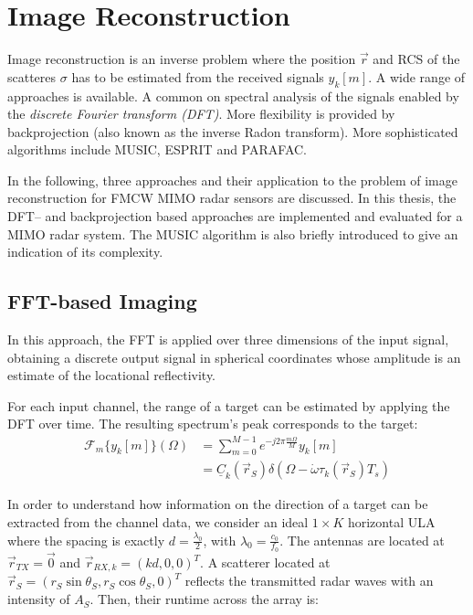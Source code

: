 \section{Image Reconstruction}
Image reconstruction is an inverse problem where the position $\vec r$ and RCS of the scatteres $\sigma$
has to be estimated from the received signals $y_k[m]$.
A wide range of approaches is available.
A common on spectral analysis of the signals enabled by the \emph{discrete Fourier transform (DFT)}.
More flexibility is provided by backprojection (also known as the inverse Radon transform).
More sophisticated algorithms include MUSIC, ESPRIT and PARAFAC.

In the following, three approaches and their application to
the problem of image reconstruction for FMCW MIMO radar sensors are discussed.
In this thesis, the DFT-- and backprojection based approaches
are implemented and evaluated for a MIMO radar system.
The MUSIC algorithm is also briefly introduced to give an indication of its complexity.

\subsection{FFT-based Imaging}
\label{sec:dft_imaging_theory}
In this approach, the FFT is applied over three dimensions of the input signal,
obtaining a discrete output signal in spherical coordinates whose amplitude is an estimate of the locational reflectivity.

For each input channel, the range of a target can be estimated by applying the DFT over time.
The resulting spectrum's peak corresponds to the target:
\begin{align}
    \mathcal{F}_m\{y_k[m]\}(\Omega) & = \sum_{m=0}^{M-1} e^{-j2\pi\frac{m\Omega}{M}} y_k[m]                                       \\
                                    & = \underline C_k(\vec r_S) \delta(\Omega-\dot \omega \tau_k(\vec r_S)T_s) \label{eq:y_fft}
\end{align}


In order to understand how information on the direction of a target can be extracted from the channel data,
we consider an ideal $1 \times K$ horizontal ULA
where the spacing is exactly $d=\frac{\lambda_0}{2}$, with $\lambda_0 = \frac{c_0}{f_0}$.
The antennas are located at $\vec r_{TX}= \vec 0$ and $\vec r_{RX,k}=(kd,0,0)^T$.
A scatterer located at  $\vec r_S = (r_S\sin\theta_S, r_{S}\cos\theta_S , 0)^T$
reflects the transmitted radar waves with an intensity of $A_S$.
Then, their runtime across the array is:

